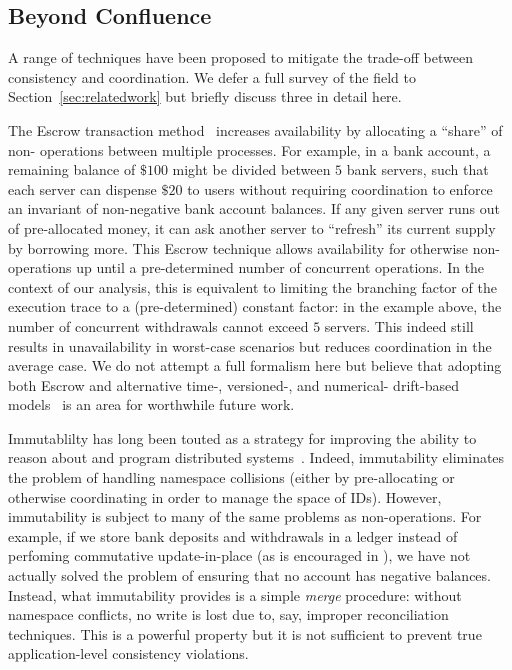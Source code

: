 
\subsection{Beyond Confluence}

A range of techniques have been proposed to mitigate the trade-off
between consistency and coordination. We defer a full survey of the
field to Section~\ref{sec:relatedwork} but briefly discuss three in
detail here.

 The Escrow transaction method~\cite{escrow}
increases availability by allocating a ``share'' of non-\iconfluent
operations between multiple processes. For example, in a bank account,
a remaining balance of $\$100$ might be divided between $5$ bank
servers, such that each server can dispense $\$20$ to users without
requiring coordination to enforce an invariant of non-negative bank
account balances. If any given server runs out of pre-allocated money,
it can ask another server to ``refresh'' its current supply by
borrowing more. This Escrow technique allows availability for
otherwise non-\iconfluent operations up until a pre-determined number
of concurrent operations. In the context of our \cfreedom analysis,
this is equivalent to limiting the branching factor of the execution
trace to a (pre-determined) constant factor: in the example above, the
number of concurrent withdrawals cannot exceed $5$ servers. This
indeed still results in unavailability in worst-case scenarios but
reduces coordination in the average case. We do not attempt a full
formalism here but believe that adopting both Escrow and alternative
time-, versioned-, and numerical- drift-based models~\cite{yu-conit}
is an area for worthwhile future work.

 Immutablilty has long been touted as a
strategy for improving the ability to reason about and program
distributed systems~\cite{helland-immutable,gray-virtues}. Indeed,
immutability eliminates the problem of handling namespace collisions
(either by pre-allocating or otherwise coordinating in order to manage
the space of IDs). However, immutability is subject to many of the
same problems as non-\iconfluent operations. For example, if we store
bank deposits and withdrawals in a ledger instead of perfoming commutative
update-in-place (as is encouraged in \lang), we have not actually
solved the problem of ensuring that no account has negative
balances. Instead, what immutability provides is a simple
\textit{merge} procedure: without namespace conflicts, no write is
lost due to, say, improper reconciliation techniques. This is a
powerful property but it is not sufficient to prevent true
application-level consistency violations.


